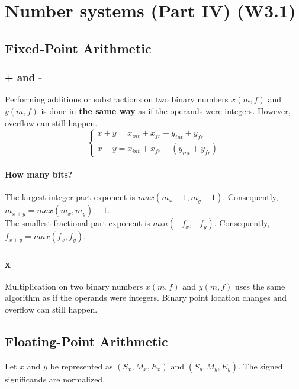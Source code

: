 \documentclass[10pt,a4paper]{book}
\begin{document}
\chapter{Number systems (Part IV) (W3.1)}

\section{Fixed-Point Arithmetic}
\subsection{+ and -}
Performing additions or substractions on two binary numbers $x(m,f)$ and $y(m,f)$ is done in \textbf{the same way} as if the operands were integers. However, overflow can still happen.
\begin{equation*}
	\begin{cases}
        x+y=x_{int}+x_{fr}+y_{int}+y_{fr}\\
        x-y=x_{int}+x_{fr}-(y_{int}+y_{fr})
    \end{cases}
\end{equation*}

\subsubsection{How many bits?}
The largest integer-part exponent is $max(m_x-1,m_y-1)$. Consequently, $m_{x\pm y}=max(m_x,m_y)+1$.\medskip \\
The smallest fractional-part exponent is $min(-f_x,-f_y)$. Consequently, $f_{x\pm y}=max(f_x,f_y)$.

\subsection{x}
Multiplication on two binary numbers $x(m,f)$ and $y(m,f)$ uses the same algorithm as if the operands were integers. Binary point location changes and overflow can still happen.

\section{Floating-Point Arithmetic}
Let $x$ and $y$ be represented as $(S_x, M_x, E_x)$ and $(S_y, M_y, E_y)$. The signed significands are normalized.
\end{document}
